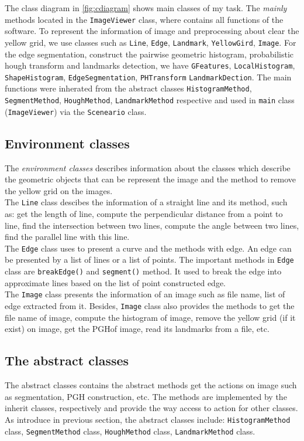 The class diagram in \ref{fig:cdiagram} shows main classes of my task. The \textit{mainly} methods located in the \texttt{ImageViewer} class, where contains all functions of the software. To represent the information of image and preprocessing about clear the yellow grid, we use classes such as \texttt{Line}, \texttt{Edge}, \texttt{Landmark}, \texttt{YellowGird}, \texttt{Image}. For the edge segmentation, construct the pairwise geometric histogram, probabilistic hough transform and landmarks detection, we have \texttt{GFeatures}, \texttt{LocalHistogram}, \texttt{ShapeHistogram}, \texttt{EdgeSegmentation}, \texttt{PHTransform} \texttt{LandmarkDection}. The main functions were inherated from the abstract classes \texttt{HistogramMethod}, \texttt{SegmentMethod}, \texttt{HoughMethod}, \texttt{LandmarkMethod} respective and used in \texttt{main} class (\texttt{ImageViewer}) via the \texttt{Sceneario} class. 
\subsection*{Environment classes}
The \textit{environment classes} describes information about the classes which describe the geometric objects that can be represent the image and the method to remove the yellow grid on the images.\\[0.2cm]
The \texttt{Line} class descibes the information of a straight line and its method, such as: get the length of line, compute the perpendicular distance from a point to line, find the intersection between two lines, compute the angle between two lines, find the parallel line with this line.\\[0.2cm]
The \texttt{Edge} class uses to present a curve and the methods with edge. An edge can be presented by a list of lines or a list of points. The important methods in \texttt{Edge} class are \texttt{breakEdge()} and \texttt{segment()} method. It used to break the edge into approximate lines based on the list of point constructed edge.\\[0.2cm]
The \texttt{Image} class presents the information of an image such as file name, list of edge extracted from it. Besides, \texttt{Image} class also provides the methods to get the file name of image, compute the histogram of image, remove the yellow grid (if it exist) on image, get the PGHof image, read its landmarks from a file, etc.
\subsection*{The abstract classes}
The abstract classes contains the abstract methods get the actions on image such as segmentation, PGH construction, etc. The methods are implemented by the inherit classes, respectively and provide the way access to action for other classes. As introduce in previous section, the abstract classes include: \texttt{HistogramMethod} class, \texttt{SegmentMethod} class, \texttt{HoughMethod} class, \texttt{LandmarkMethod} class.
